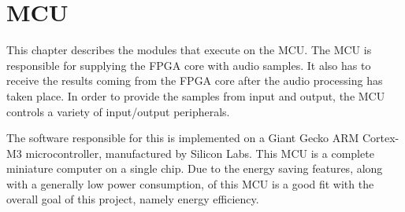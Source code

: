 \clearpage
\section{MCU} \label{section:mcu}

This chapter describes the modules that execute on the MCU. The MCU is
responsible for supplying the FPGA core  with audio
samples. It also has to receive the results coming from the FPGA core after the
audio processing has taken place. In order to provide the samples from input and
output, the MCU controls a variety of input/output peripherals.

The software responsible for this is implemented on a Giant Gecko ARM Cortex-M3
microcontroller, manufactured by Silicon Labs. This MCU is a complete miniature
computer on a single chip. Due to the energy saving features, along with a
generally low power consumption, of this MCU is a good fit with the overall goal
of this project, namely energy efficiency.








